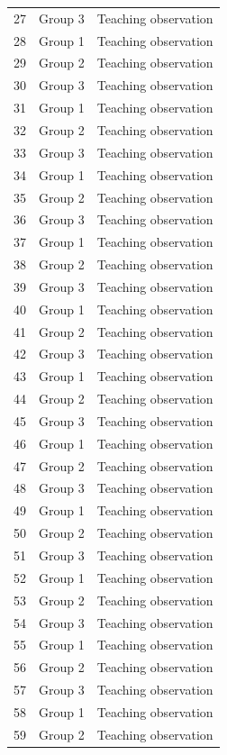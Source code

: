 \documentclass[11pt]{article}
\begin{document}
\begin{longtable}{@{}rll@{}}
27 & Group 3 & Teaching observation \\
28 & Group 1 & Teaching observation \\
29 & Group 2 & Teaching observation \\
30 & Group 3 & Teaching observation \\
31 & Group 1 & Teaching observation \\
32 & Group 2 & Teaching observation \\
33 & Group 3 & Teaching observation \\
34 & Group 1 & Teaching observation \\
35 & Group 2 & Teaching observation \\
36 & Group 3 & Teaching observation \\
37 & Group 1 & Teaching observation \\
38 & Group 2 & Teaching observation \\
39 & Group 3 & Teaching observation \\
40 & Group 1 & Teaching observation \\
41 & Group 2 & Teaching observation \\
42 & Group 3 & Teaching observation \\
43 & Group 1 & Teaching observation \\
44 & Group 2 & Teaching observation \\
45 & Group 3 & Teaching observation \\
46 & Group 1 & Teaching observation \\
47 & Group 2 & Teaching observation \\
48 & Group 3 & Teaching observation \\
49 & Group 1 & Teaching observation \\
50 & Group 2 & Teaching observation \\
51 & Group 3 & Teaching observation \\
52 & Group 1 & Teaching observation \\
53 & Group 2 & Teaching observation \\
54 & Group 3 & Teaching observation \\
55 & Group 1 & Teaching observation \\
56 & Group 2 & Teaching observation \\
57 & Group 3 & Teaching observation \\
58 & Group 1 & Teaching observation \\
59 & Group 2 & Teaching observation \\

\end{longtable}
\end{document}
